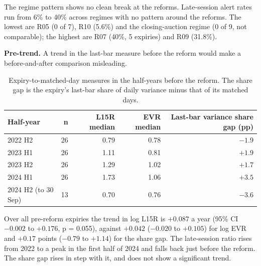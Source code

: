 \documentclass[10pt,a4paper]{article}
\begin{document}
The regime pattern shows no clean break at the reforms. Late-session alert rates run from 6\% to 40\% across regimes with no pattern around the reforms. The lowest are R05 (0 of 7), R10 (5.6\%) and the closing-auction regime (0 of 9, not comparable); the highest are R07 (40\%, 5 expiries) and R09 (31.8\%).

\textbf{Pre-trend.} A trend in the last-bar measure before the reform would make a before-and-after comparison misleading.
\begin{table}[h!]\centering\small
\begin{tabular}{lrrrr}
\toprule
Half-year & n & L15R median & EVR median & Last-bar variance share gap (pp)\\
\midrule
2022 H2 & 26 & 0.79 & 0.78 & $-1.9$\\
2023 H1 & 26 & 1.11 & 0.81 & $+1.9$\\
2023 H2 & 26 & 1.29 & 1.02 & $+1.7$\\
2024 H1 & 26 & 1.73 & 1.06 & $+3.5$\\
2024 H2 (to 30 Sep) & 13 & 0.70 & 0.76 & $-3.6$\\
\bottomrule
\end{tabular}
\caption{Expiry-to-matched-day measures in the half-years before the reform. The share gap is the expiry's last-bar share of daily variance minus that of its matched days.}
\end{table}
Over all pre-reform expiries the trend in log L15R is $+0.087$ a year (95\% CI $-0.002$ to $+0.176$, p = 0.055), against $+0.042$ ($-0.020$ to $+0.105$) for log EVR and $+0.17$ points ($-0.79$ to $+1.14$) for the share gap. The late-session ratio rises from 2022 to a peak in the first half of 2024 and falls back just before the reform. The share gap rises in step with it, and does not show a significant trend.
\end{document}
